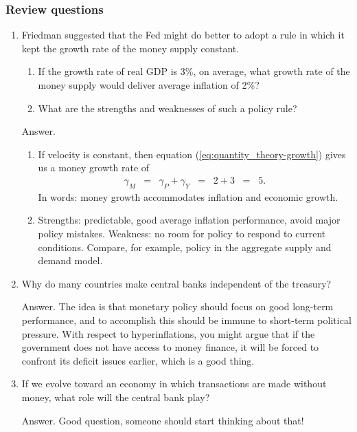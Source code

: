 \documentclass[letterpaper,12pt]{article}
\begin{document}
\subsubsection*{Review questions}

\begin{enumerate}
\item Friedman suggested that the Fed might do better to adopt
a rule in which it kept the growth rate of the money supply constant.
\begin{enumerate}
\item If the growth rate of real GDP is 3\%, on average,
what growth rate of the money supply would deliver
average inflation of 2\%?
\item What are the strengths and weaknesses of such a policy rule?
\end{enumerate}

Answer.
\begin{enumerate}
\item If velocity is constant, then
equation (\ref{eq:quantity_theory-growth}) gives us
a money growth rate of
\begin{eqnarray*}
    \gamma_M &=& \gamma_P + \gamma_Y
            \;\;=\;\;  2 + 3 \;\;=\;\; 5.
\end{eqnarray*}
In words: money growth accommodates inflation and economic growth.
\item Strengths: predictable, good average inflation performance,
avoid major policy mistakes.
Weakness: no room for policy to respond to current conditions.
Compare, for example, policy in the aggregate supply and demand model.
\end{enumerate}


\item Why do many countries make central banks independent of the
treasury?

Answer.  The idea is that monetary policy should focus on good long-term
performance, and to accomplish this should be immune to
short-term political pressure.
With respect to hyperinflations,
you might argue that if the government does not have access to money finance,
it will be forced to confront its deficit issues earlier,
which is a good thing.

\item If we evolve toward an economy in which transactions are made without
money, what role will the central bank play?

Answer.  Good question, someone should start thinking about that!


\end{enumerate}
\end{document}
